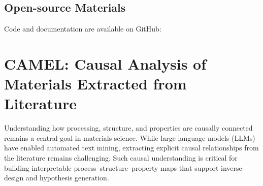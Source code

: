 \subsection*{Open-source Materials}
Code and documentation are available on GitHub: 








\section{CAMEL: Causal Analysis of Materials Extracted from Literature}



Understanding how processing, structure, and properties are causally connected remains a central goal in materials science. While large language models (LLMs) have enabled automated text mining, extracting explicit causal relationships from the literature remains challenging. Such causal understanding is critical for building interpretable process–structure–property maps that support inverse design and hypothesis generation.

